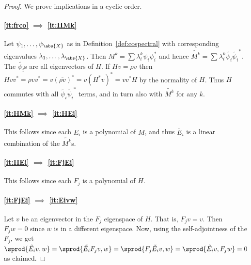 \begin{proof} We prove implications in a cyclic order.
\paragraph{\ref{it:frco} $\implies$ \ref{it:HMk}} Let $\psi_1, \dots, \psi_{\abs{X}}$ as in Definition~\ref{def:cospectral} with corresponding eigenvalues $\lambda_1, \dots , \lambda_{\abs{X}}$.
Then $M^k = \sum \lambda_i^k \psi_i \psi_i^*$ and hence $\widetilde{M^k} = \sum \lambda_i^k \tilde{\psi_i} \tilde{\psi_i}^*$. The $\tilde{\psi_i}$s are all eigenvectors of $H$. If $H v = \rho v$ then $H v v^* = \rho v v^* = v (\bar{\rho v})^* = v (H^* v)^*  = v v^* H$ by the normality of $H$. Thus $H$ commutes with all $\tilde{\psi_i} \tilde{\psi_i}^*$ terms, and in turn also with $\widetilde{M^k}$ for any $k$.

\paragraph{\ref{it:HMk} $\implies$ \ref{it:HEi}} This follows since each $E_i$ is a polynomial of $M$, and thus $\tilde{E_i}$ is a linear combination of the $\widetilde{M^k}$s.

\paragraph{\ref{it:HEi} $\implies$ \ref{it:FjEi}} This follows since each $F_j$ is a polynomial of $H$.

\paragraph{\ref{it:FjEi} $\implies$ \ref{it:Eivw}} Let $v$ be an eigenvector in the $F_j$ eigenspace of $H$. That is, $F_j v = v$. Then $F_j w= 0$ since $w$ is in a different eigenspace. Now, using the self-adjointness of the $F_j$, we get $\sprod{\tilde{E_i} v, w} = \sprod{\tilde{E_i} F_j v, w} = \sprod{F_j \tilde{E_i} v, w} = \sprod{\tilde{E_i} v, F_j w} = 0$ as claimed.


\end{proof}
